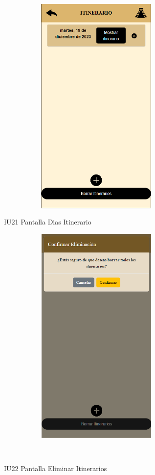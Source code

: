 \begin{figure}[htb]
    \begin{minipage}{1\textwidth}
    \centering
    \includegraphics[width=10cm, height=11cm]{entregable final/pantallasSistema/IU21 Pantalla Dias Itinerario.png}
    \caption{IU21 Pantalla Dias Itinerario}
\end{minipage}

    \begin{minipage}{1\textwidth}
        \centering
        \includegraphics[width=10cm, height=11cm]{entregable final/pantallasSistema/IU22 Pantalla Eliminar Itinerarios.png}
        \caption{IU22 Pantalla Eliminar Itinerarios}
    \end{minipage}
    \\
\end{figure}
